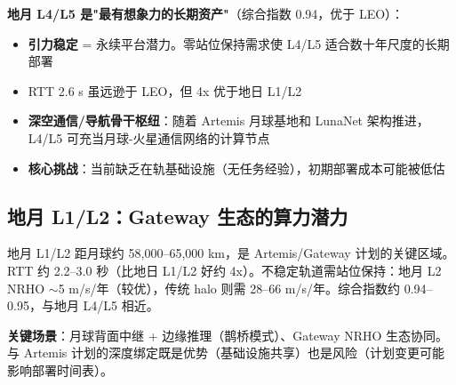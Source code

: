 \textbf{地月 L4/L5 是"最有想象力的长期资产"}（综合指数 0.94，优于 LEO）：
\begin{itemize}
    \item \textbf{引力稳定} = 永续平台潜力。零站位保持需求使 L4/L5 适合数十年尺度的长期部署
    \item RTT 2.6 s 虽远逊于 LEO，但 4x 优于地日 L1/L2
    \item \textbf{深空通信/导航骨干枢纽}：随着 Artemis 月球基地和 LunaNet 架构推进，L4/L5 可充当月球-火星通信网络的计算节点
    \item \textbf{核心挑战}：当前缺乏在轨基础设施（无任务经验），初期部署成本可能被低估
\end{itemize}

\subsection{地月 L1/L2：Gateway 生态的算力潜力}

地月 L1/L2 距月球约 58,000--65,000 km，是 Artemis/Gateway 计划的关键区域。RTT 约 2.2--3.0 秒（比地日 L1/L2 好约 4x）。不稳定轨道需站位保持：地月 L2 NRHO $\sim$5 m/s/年（较优），传统 halo 则需 28--66 m/s/年。综合指数约 0.94--0.95，与地月 L4/L5 相近。

\textbf{关键场景}：月球背面中继 + 边缘推理（鹊桥模式）、Gateway NRHO 生态协同。与 Artemis 计划的深度绑定既是优势（基础设施共享）也是风险（计划变更可能影响部署时间表）。
